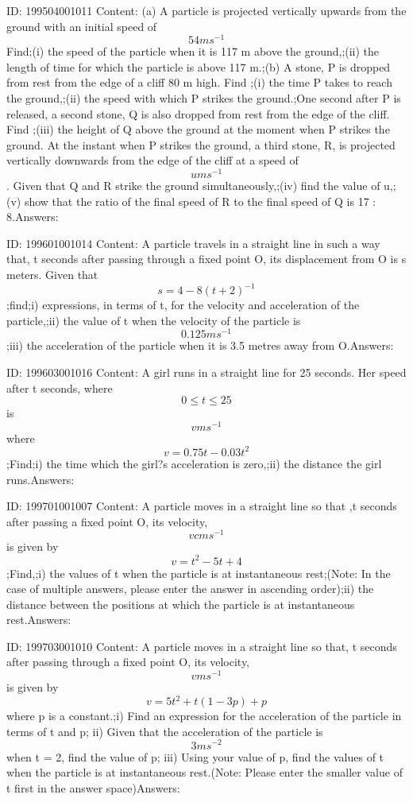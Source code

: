 \documentclass{article}
\begin{document}
ID: 199504001011
Content:
(a)	    A particle is projected vertically upwards from the ground with an initial speed of \[54ms^{-1}\] Find;(i)	the speed of the particle when it is 117 m above the ground,;(ii)	the length of time for which the particle is above 117 m.;(b)	A stone, P is dropped from rest from the edge of a cliff 80 m high. Find ;(i)	the time P takes to reach the ground,;(ii)	the speed with which P strikes the ground.;One second after P is released, a second stone, Q is also dropped from rest from the edge of the cliff. Find ;(iii)	the height of Q above the ground at the moment when P strikes the ground. At the instant when P strikes the ground, a third stone, R, is projected vertically downwards from the edge of the cliff at a speed of \[u ms^{-1}\]. Given that Q and R strike the ground simultaneously,;(iv)	find the value of u,;(v)	show that the ratio of the final speed of R to the final speed of Q is 17 : 8.Answers:

ID: 199601001014
Content:
A particle travels in a straight line in such a way that, t seconds after passing through a fixed point O, its displacement from O is s meters. Given that \[s=4-8(t+2)^{-1}\];find;i)	expressions, in terms of t, for the velocity and acceleration of the particle,;ii)	the value of t when the velocity of the particle is \[0.125m s^{-1}\];iii)	the acceleration of the particle when it is 3.5 metres away from O.Answers:

ID: 199603001016
Content:
A girl runs in a straight line for 25 seconds. Her speed after t seconds, where \[0\leq t\leq 25\] is \[vms^{-1}\] where \[v=0.75t-0.03t^2\];Find;i) the time which the girl?s acceleration is zero,;ii) the distance the girl runs.Answers:

ID: 199701001007
Content:
A particle moves in a straight line so that ,t seconds after passing a fixed point O, its velocity, \[vcms^{-1}\] is given by \[v=t^2-5t+4\];Find,;i) the values of t when the particle is at instantaneous rest;(Note: In the case of multiple answers, please enter the answer in ascending order);ii) the distance between the positions at which the particle is at instantaneous rest.Answers:

ID: 199703001010
Content:
A particle moves in a straight line so that, t seconds after passing through a fixed point O, its velocity, \[vms^{-1}\] is given by \[v=5t^2+t(1-3p)+p\] where p is a constant.;i) Find an expression for the acceleration of the particle in terms of t and p; ii) Given that the acceleration of the particle is \[3ms^{-2}\]when t = 2, find the value of p; iii) Using your value of p, find the values of t when the particle is at instantaneous rest.(Note: Please enter the smaller value of t first in the answer space)Answers:
\end{document}

